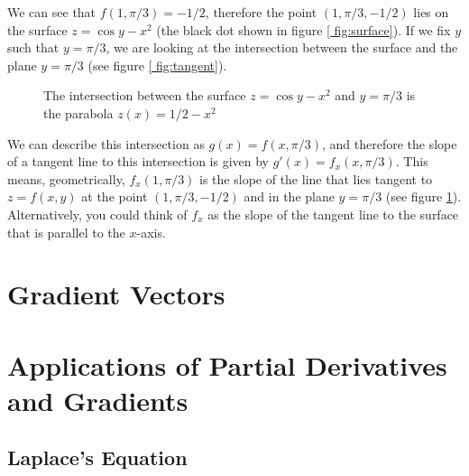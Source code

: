 We can see that $f(1, \pi/3) = -1/2$, therefore the point $(1, \pi/3, -1/2)$ 
lies on the surface $z = \cos{y} - x^2$ (the black dot shown in figure \ref{
fig:surface}). If we fix $y$ such that $y = \pi/3$, we are looking at the 
intersection between the surface and the plane $y = \pi/3$ (see figure \ref{
fig:tangent}). 

\begin{figure}[htbp]
    \centering
    \caption{The intersection between the surface $z = \cos{y} - x^2$ and $y = 
    \pi/3$ is the parabola $z(x) = 1/2 - x^2$}
    \label{fig:tangent}
\end{figure}

We can describe this intersection as $g(x) = f(x, \pi/3)$, and therefore the 
slope of a tangent line to this intersection is given by $g'(x) = f_x(x, 
\pi/3)$. This means, geometrically, $f_x(1, \pi/3)$ is the slope of the line 
that lies tangent to $z = f(x, y)$ at the point $(1, \pi/3, -1/2)$ and in the 
plane $y = \pi/3$ (see figure \ref{fig:tangent}). Alternatively, you could 
think of $f_x$ as the slope of the tangent line to the surface that is 
parallel to the $x$-axis. 

\section{Gradient Vectors}

\section{Applications of Partial Derivatives and Gradients}

\subsection{Laplace's Equation}